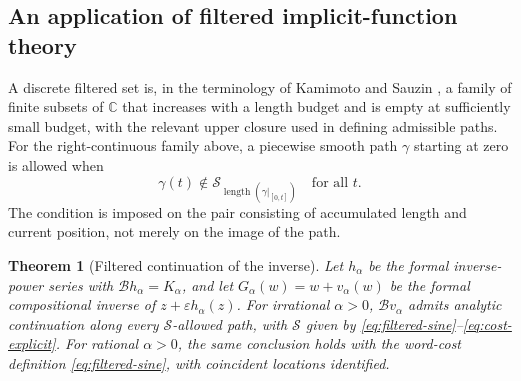\documentclass[11pt,a4paper]{article}
\numberwithin{equation}{section}
\newtheorem{theorem}{Theorem}[section]
\theoremstyle{definition}
\theoremstyle{remark}
\newcommand{\C}{\mathbb C}
\newcommand{\B}{\mathcal B}
\newcommand{\sincost}{\mathcal S}
\begin{document}
\subsection{An application of filtered implicit-function theory}\label{sec:filtered}

A discrete filtered set is, in the terminology of Kamimoto and
Sauzin \cite[Definitions 2.1--2.8]{kamimoto-sauzin}, a family of
finite subsets of $\C$ that increases with a length budget and is
empty at sufficiently small budget, with the relevant upper closure
used in defining admissible paths. For the right-continuous family
above, a piecewise smooth path $\gamma$ starting at zero is allowed
when
\[
 \gamma(t)\notin\sincost_{\operatorname{length}(\gamma|_{[0,t]})}
 \quad\text{for all }t.
\]
The condition is imposed on the pair consisting of accumulated length
and current position, not merely on the image of the path.

\begin{theorem}[Filtered continuation of the inverse]\label{thm:filtered}
Let $h_\alpha$ be the formal inverse-power series with
$\B h_\alpha=K_\alpha$, and let
$G_\alpha(w)=w+v_\alpha(w)$ be the formal compositional inverse of
$z+\varepsilon h_\alpha(z)$.
For irrational $\alpha>0$, $\B v_\alpha$ admits analytic continuation
along every $\sincost$-allowed path, with $\sincost$ given by
\eqref{eq:filtered-sine}--\eqref{eq:cost-explicit}.
For rational $\alpha>0$, the same conclusion holds with the
word-cost definition \eqref{eq:filtered-sine}, with coincident
locations identified.
\end{theorem}
\end{document}
